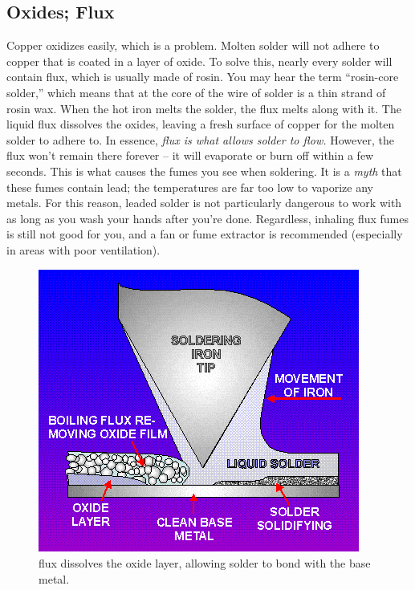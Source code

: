 \subsection{Oxides; Flux}
Copper oxidizes easily, which is a problem. Molten solder will not adhere to copper that is coated in a layer of oxide. To solve this, nearly every solder will contain flux, which is usually made of rosin. You may hear the term ``rosin-core solder,'' which means that at the core of the wire of solder is a thin strand of rosin wax. When the hot iron melts the solder, the flux melts along with it. The liquid flux dissolves the oxides, leaving a fresh surface of copper for the molten solder to adhere to. In essence, \emph{flux is what allows solder to flow.} However, the flux won’t remain there forever – it will evaporate or burn off within a few seconds. This is what causes the fumes you see when soldering. It is a \emph{myth} that these fumes contain lead; the temperatures are far too low to vaporize any metals. For this reason, leaded solder is not particularly dangerous to work with as long as you wash your hands after you’re done. Regardless, inhaling flux fumes is still not good for you, and a fan or fume extractor is recommended (especially in areas with poor ventilation).
\begin{figure}[h]
    \caption{flux dissolves the oxide layer, allowing solder to bond with the base metal.}
    \centering \includegraphics[scale=0.675]{images/oxidation_diagram.jpg}
\end{figure}

